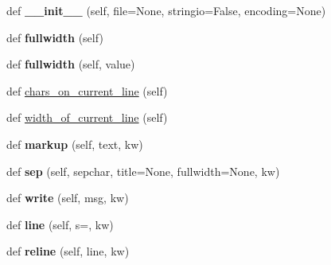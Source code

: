 \begin{DoxyCompactItemize}
\item 
\mbox{\label{classpy_1_1__io_1_1terminalwriter_1_1_terminal_writer_ac7dde86bfe87b42daf71c619354c0945}} 
def {\bfseries \+\_\+\+\_\+init\+\_\+\+\_\+} (self, file=None, stringio=False, encoding=None)
\item 
\mbox{\label{classpy_1_1__io_1_1terminalwriter_1_1_terminal_writer_aff9f86ff1921ad9591841db76415d3b0}} 
def {\bfseries fullwidth} (self)
\item 
\mbox{\label{classpy_1_1__io_1_1terminalwriter_1_1_terminal_writer_a55fc66c80e0c84c4ca7bdd3515d0d6d3}} 
def {\bfseries fullwidth} (self, value)
\item 
def \hyperlink{classpy_1_1__io_1_1terminalwriter_1_1_terminal_writer_a68d85d7dac6e2fb3c9794728e3270d1e}{chars\+\_\+on\+\_\+current\+\_\+line} (self)
\item 
def \hyperlink{classpy_1_1__io_1_1terminalwriter_1_1_terminal_writer_a6c5d1fdeca6dba25b2aec1822b38097d}{width\+\_\+of\+\_\+current\+\_\+line} (self)
\item 
\mbox{\label{classpy_1_1__io_1_1terminalwriter_1_1_terminal_writer_aa37672167ad6a2d93dcd8b0685af933e}} 
def {\bfseries markup} (self, text, kw)
\item 
\mbox{\label{classpy_1_1__io_1_1terminalwriter_1_1_terminal_writer_a3dcc0704562f4ad5551826ae4a2c7196}} 
def {\bfseries sep} (self, sepchar, title=None, fullwidth=None, kw)
\item 
\mbox{\label{classpy_1_1__io_1_1terminalwriter_1_1_terminal_writer_ae7d48c96d35a12b29c46d681d2db7a89}} 
def {\bfseries write} (self, msg, kw)
\item 
\mbox{\label{classpy_1_1__io_1_1terminalwriter_1_1_terminal_writer_a00f88e453a4b4e857be3563424a9891a}} 
def {\bfseries line} (self, s=\textquotesingle{}\textquotesingle{}, kw)
\item 
\mbox{\label{classpy_1_1__io_1_1terminalwriter_1_1_terminal_writer_ad3b1bb6b40aa362c612761b37728edba}} 
def {\bfseries reline} (self, line, kw)
\end{DoxyCompactItemize}
